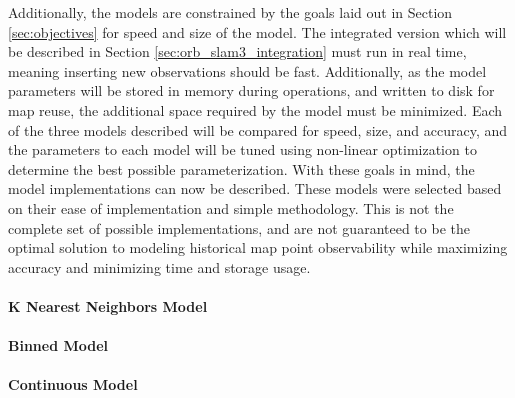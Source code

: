 Additionally, the models are constrained by the goals laid out in Section \ref{sec:objectives} for speed and size of the model. The integrated version which will be described in Section \ref{sec:orb_slam3_integration} must run in real time, meaning inserting new observations should be fast. Additionally, as the model parameters will be stored in memory during operations, and written to disk for map reuse, the additional space required by the model must be minimized. Each of the three models described will be compared for speed, size, and accuracy, and the parameters to each model will be tuned using non-linear optimization to determine the best possible parameterization. With these goals in mind, the model implementations can now be described. These models were selected based on their ease of implementation and simple methodology. This is not the complete set of possible implementations, and are not guaranteed to be the optimal solution to modeling historical map point observability while maximizing accuracy and minimizing time and storage usage.

\paragraph{K Nearest Neighbors Model}
\paragraph{Binned Model}
\paragraph{Continuous Model}